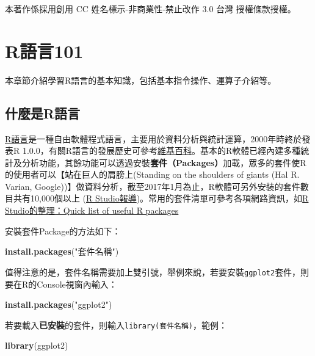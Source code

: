 \documentclass[]{book}
\newenvironment{Shaded}{\begin{snugshade}}{\end{snugshade}}
\newcommand{\KeywordTok}[1]{\textcolor[rgb]{0.13,0.29,0.53}{\textbf{{#1}}}}
\newcommand{\StringTok}[1]{\textcolor[rgb]{0.31,0.60,0.02}{{#1}}}
\newcommand{\NormalTok}[1]{{#1}}
\theoremstyle{definition}
\theoremstyle{definition}
\theoremstyle{remark}
\begin{document}
本著作係採用創用 CC 姓名標示-非商業性-禁止改作 3.0 台灣 授權條款授權。

\chapter{R語言101}\label{intro}

本章節介紹學習R語言的基本知識，包括基本指令操作、運算子介紹等。

\section{什麼是R語言}\label{r}

\href{http://www.r-project.org/}{R語言}是一種自由軟體程式語言，主要用於資料分析與統計運算，2000年時終於發表R
1.0.0，有關R語言的發展歷史可參考\href{https://zh.wikipedia.org/wiki/R\%E8\%AF\%AD\%E8\%A8\%80}{維基百科}。基本的R軟體已經內建多種統計及分析功能，其餘功能可以透過安裝\textbf{套件（Packages）}加載，眾多的套件使R的使用者可以【站在巨人的肩膀上(Standing
on the shoulders of giants (Hal R. Varian,
Google))】做資料分析，截至2017年1月為止，R軟體可另外安裝的套件數目共有10,000個以上
(\href{https://www.rstudio.com/rviews/2017/01/06/10000-cran-packages/}{R
Studio報導})。常用的套件清單可參考各項網路資訊，如\href{https://support.rstudio.com/hc/en-us/articles/201057987-Quick-list-of-useful-R-packages}{R
Studio的整理：Quick list of useful R packages}

安裝套件Package的方法如下：

\begin{Shaded}
\begin{Highlighting}[]
\KeywordTok{install.packages}\NormalTok{(}\StringTok{"套件名稱"}\NormalTok{)}
\end{Highlighting}
\end{Shaded}

值得注意的是，套件名稱需要加上雙引號，舉例來說，若要安裝\texttt{ggplot2}套件，則要在R的Console視窗內輸入：

\begin{Shaded}
\begin{Highlighting}[]
\KeywordTok{install.packages}\NormalTok{(}\StringTok{"ggplot2"}\NormalTok{)}
\end{Highlighting}
\end{Shaded}

若要載入\textbf{已安裝}的套件，則輸入\texttt{library(套件名稱)}，範例：

\begin{Shaded}
\begin{Highlighting}[]
\KeywordTok{library}\NormalTok{(ggplot2)}
\end{Highlighting}
\end{Shaded}
\end{document}
